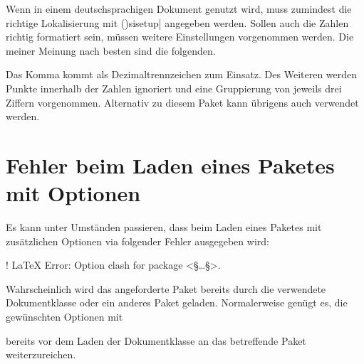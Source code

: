 Wenn  in einem deutschsprachigen Dokument genutzt wird, muss 
zumindest die richtige Lokalisierung mit 
\Macro(){sisetup|} angegeben werden. 
Sollen auch die Zahlen richtig formatiert sein, müssen weitere Einstellungen 
vorgenommen werden. Die meiner Meinung nach besten sind die folgenden.
%
\begin{quoting}
\begin{Code}
\end{Code}
\end{quoting}
%
Das Komma kommt als Dezimaltrennzeichen zum Einsatz. Des Weiteren werden Punkte 
innerhalb der Zahlen ignoriert und eine Gruppierung von jeweils drei Ziffern 
vorgenommen. Alternativ zu diesem Paket kann übrigens auch  
verwendet werden.



\section{%
  Fehler beim Laden eines Paketes mit Optionen%
  \label{sec:tips:options}%
}

%
%
%
Es kann unter Umständen passieren, dass beim Laden eines Paketes mit 
zusätzlichen Optionen via  folgender Fehler ausgegeben wird:
%
\begin{quoting}
\begin{Code}
! LaTeX Error: Option clash for package <§\dots§>.
\end{Code}
\end{quoting}
%
Wahrscheinlich wird das angeforderte Paket bereits durch die verwendete 
Dokumentklasse oder ein anderes Paket geladen. Normalerweise genügt es, die 
gewünschten Optionen mit
\begin{quoting}
\begin{Entity}{}
\newline%
%
\end{Entity}
\end{quoting}
bereits vor dem Laden der Dokumentklasse an das betreffende Paket 
weiterzureichen.



